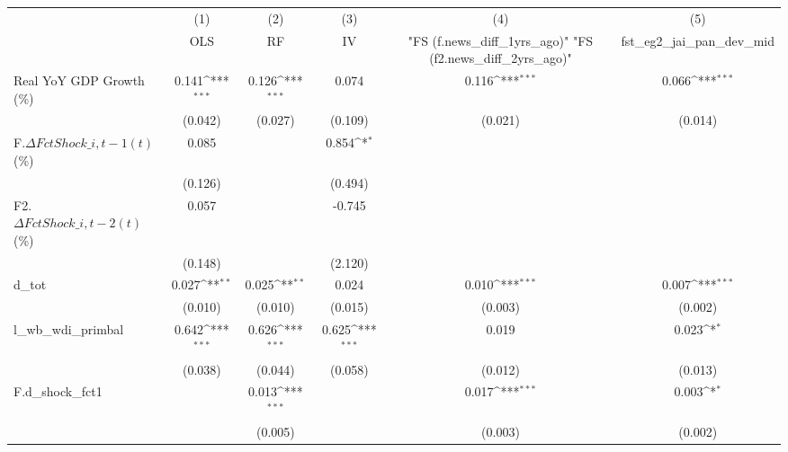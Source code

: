 {
\def\sym#1{\ifmmode^{#1}\else\(^{#1}\)\fi}
\begin{tabular}{l*{5}{c}}
\toprule
                    &\multicolumn{1}{c}{(1)}&\multicolumn{1}{c}{(2)}&\multicolumn{1}{c}{(3)}&\multicolumn{1}{c}{(4)}&\multicolumn{1}{c}{(5)}\\
                    &\multicolumn{1}{c}{OLS}&\multicolumn{1}{c}{RF}&\multicolumn{1}{c}{IV}&\multicolumn{1}{c}{ "FS (f.news\_diff\_1yrs\_ago)"  "FS (f2.news\_diff\_2yrs\_ago)" }&\multicolumn{1}{c}{fst\_eg2\_jai\_pan\_dev\_mid}\\
\midrule
Real YoY GDP Growth (\%)&       0.141\sym{***}&       0.126\sym{***}&       0.074         &       0.116\sym{***}&       0.066\sym{***}\\
                    &     (0.042)         &     (0.027)         &     (0.109)         &     (0.021)         &     (0.014)         \\
\addlinespace
F.$\Delta FctShock\_{i,t-1}(t)$ (\%)&       0.085         &                     &       0.854\sym{*}  &                     &                     \\
                    &     (0.126)         &                     &     (0.494)         &                     &                     \\
\addlinespace
F2.$\Delta FctShock\_{i,t-2}(t)$ (\%)&       0.057         &                     &      -0.745         &                     &                     \\
                    &     (0.148)         &                     &     (2.120)         &                     &                     \\
\addlinespace
d\_tot               &       0.027\sym{**} &       0.025\sym{**} &       0.024         &       0.010\sym{***}&       0.007\sym{***}\\
                    &     (0.010)         &     (0.010)         &     (0.015)         &     (0.003)         &     (0.002)         \\
\addlinespace
l\_wb\_wdi\_primbal    &       0.642\sym{***}&       0.626\sym{***}&       0.625\sym{***}&       0.019         &       0.023\sym{*}  \\
                    &     (0.038)         &     (0.044)         &     (0.058)         &     (0.012)         &     (0.013)         \\
\addlinespace
F.d\_shock\_fct1      &                     &       0.013\sym{***}&                     &       0.017\sym{***}&       0.003\sym{*}  \\
                    &                     &     (0.005)         &                     &     (0.003)         &     (0.002)         \\

\end{tabular}}
